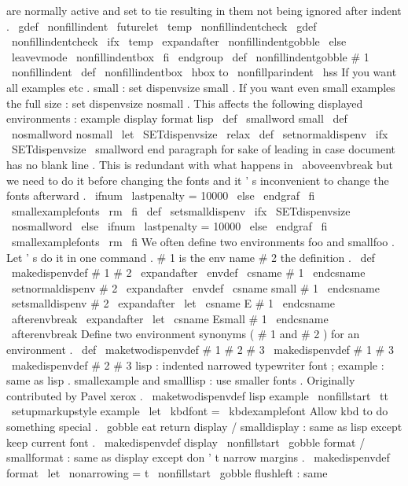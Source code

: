 {{{{are
normally
%
active
and
set
to
tie
resulting
in
them
not
being
ignored
after
%
indent
.
\
gdef
\
nonfillindent
{
\
futurelet
\
temp
\
nonfillindentcheck
}
%
\
gdef
\
nonfillindentcheck
{
%
\
ifx
\
temp
%
\
expandafter
\
nonfillindentgobble
%
\
else
%
\
leavevmode
\
nonfillindentbox
%
\
fi
%
}
%
\
endgroup
\
def
\
nonfillindentgobble
#
1
{
\
nonfillindent
}
\
def
\
nonfillindentbox
{
\
hbox
to
\
nonfillparindent
{
\
hss
}
}
%
If
you
want
all
examples
etc
.
small
:
set
dispenvsize
small
.
%
If
you
want
even
small
examples
the
full
size
:
set
dispenvsize
nosmall
.
%
This
affects
the
following
displayed
environments
:
%
example
display
format
lisp
%
\
def
\
smallword
{
small
}
\
def
\
nosmallword
{
nosmall
}
\
let
\
SETdispenvsize
\
relax
\
def
\
setnormaldispenv
{
%
\
ifx
\
SETdispenvsize
\
smallword
%
end
paragraph
for
sake
of
leading
in
case
document
has
no
blank
%
line
.
This
is
redundant
with
what
happens
in
\
aboveenvbreak
but
%
we
need
to
do
it
before
changing
the
fonts
and
it
'
s
inconvenient
%
to
change
the
fonts
afterward
.
\
ifnum
\
lastpenalty
=
10000
\
else
\
endgraf
\
fi
\
smallexamplefonts
\
rm
\
fi
}
\
def
\
setsmalldispenv
{
%
\
ifx
\
SETdispenvsize
\
nosmallword
\
else
\
ifnum
\
lastpenalty
=
10000
\
else
\
endgraf
\
fi
\
smallexamplefonts
\
rm
\
fi
}
%
We
often
define
two
environments
foo
and
smallfoo
.
%
Let
'
s
do
it
in
one
command
.
#
1
is
the
env
name
#
2
the
definition
.
\
def
\
makedispenvdef
#
1
#
2
{
%
\
expandafter
\
envdef
\
csname
#
1
\
endcsname
{
\
setnormaldispenv
#
2
}
%
\
expandafter
\
envdef
\
csname
small
#
1
\
endcsname
{
\
setsmalldispenv
#
2
}
%
\
expandafter
\
let
\
csname
E
#
1
\
endcsname
\
afterenvbreak
\
expandafter
\
let
\
csname
Esmall
#
1
\
endcsname
\
afterenvbreak
}
%
Define
two
environment
synonyms
(
#
1
and
#
2
)
for
an
environment
.
\
def
\
maketwodispenvdef
#
1
#
2
#
3
{
%
\
makedispenvdef
{
#
1
}
{
#
3
}
%
\
makedispenvdef
{
#
2
}
{
#
3
}
%
}
%
%
lisp
:
indented
narrowed
typewriter
font
;
%
example
:
same
as
lisp
.
%
%
smallexample
and
smalllisp
:
use
smaller
fonts
.
%
Originally
contributed
by
Pavel
xerox
.
%
\
maketwodispenvdef
{
lisp
}
{
example
}
{
%
\
nonfillstart
\
tt
\
setupmarkupstyle
{
example
}
%
\
let
\
kbdfont
=
\
kbdexamplefont
%
Allow
kbd
to
do
something
special
.
\
gobble
%
eat
return
}
%
display
/
smalldisplay
:
same
as
lisp
except
keep
current
font
.
%
\
makedispenvdef
{
display
}
{
%
\
nonfillstart
\
gobble
}
%
format
/
smallformat
:
same
as
display
except
don
'
t
narrow
margins
.
%
\
makedispenvdef
{
format
}
{
%
\
let
\
nonarrowing
=
t
%
\
nonfillstart
\
gobble
}
%
flushleft
:
same
}}}}
